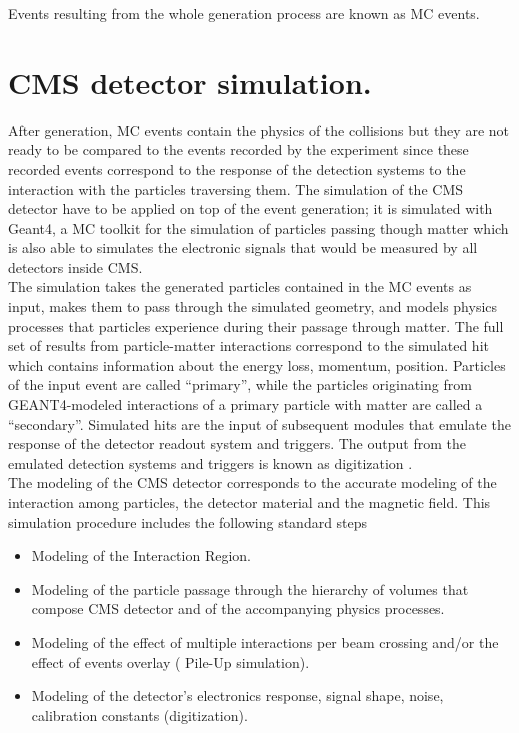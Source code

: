 \noindent Events resulting from the whole generation process are known as MC events. 

\section{CMS detector simulation.}

\noindent After generation, MC events contain the physics of the collisions but they are not ready to be compared to the events recorded by the experiment since these recorded events correspond to the response of the detection systems to the interaction with the particles traversing them. The simulation of the CMS detector have to be applied on top of the event generation; it is simulated with Geant4, a MC toolkit for the simulation of particles passing though matter which is also able to simulates the electronic signals that would be measured by all detectors inside CMS.\\   

\noindent The simulation takes the generated particles contained in the MC events as input, makes them to pass through the simulated geometry, and models physics processes that particles experience during their passage through matter. The full set of results from particle-matter interactions correspond to the simulated hit which contains information about the energy loss, momentum, position. Particles of the input event are called ``primary'', while the particles originating from GEANT4-modeled interactions of a primary particle with matter are called a ``secondary''.  Simulated hits are the input of subsequent modules that emulate the response of the detector readout system and triggers. The output from the emulated detection systems and triggers is known as digitization \cite{geant,geant2}.\\

\noindent The modeling of the CMS detector corresponds to the accurate modeling of the interaction among particles, the detector material and the magnetic field. This simulation procedure includes the following standard steps
\begin{itemize}
\item Modeling of the Interaction Region.
\item Modeling of the particle passage through the hierarchy of volumes that compose CMS detector and of the accompanying physics processes.
\item Modeling of the effect of multiple interactions per beam crossing and/or the effect of events overlay ( Pile-Up simulation).
\item Modeling of the detector's electronics response, signal shape, noise, calibration constants (digitization). 
\end{itemize}

